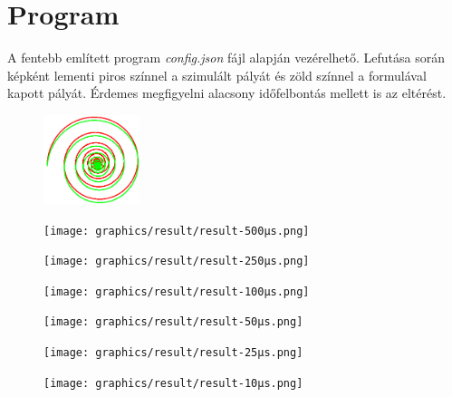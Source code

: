 \documentclass[a4paper]{article}
\begin{document}
\section{Program}
	A fentebb említett program \textit{config.json} fájl alapján vezérelhető. Lefutása során képként lementi piros színnel a szimulált pályát és zöld színnel a formulával kapott pályát. Érdemes megfigyelni alacsony időfelbontás mellett is az eltérést.
	\begin{figure}[h]
		\centering
		\begin{minipage}{0.25\textwidth}
			\centering
			\includegraphics[height=7em]{graphics/result/result-1ms.png}
		\end{minipage}%
		\begin{minipage}{0.25\textwidth}
			\centering
			\texttt{[image: graphics/result/result-500µs.png]}
		\end{minipage}%
		\begin{minipage}{0.25\textwidth}
			\centering
			\texttt{[image: graphics/result/result-250µs.png]}
		\end{minipage}%
		\begin{minipage}{0.25\textwidth}
			\centering
			\texttt{[image: graphics/result/result-100µs.png]}
		\end{minipage}
	\end{figure}
	\begin{figure}[h]
		\centering
		\begin{minipage}{0.25\textwidth}
			\centering
			\texttt{[image: graphics/result/result-50µs.png]}
		\end{minipage}%
		\begin{minipage}{0.25\textwidth}
			\centering
			\texttt{[image: graphics/result/result-25µs.png]}
		\end{minipage}%
		\begin{minipage}{0.25\textwidth}
			\centering
			\texttt{[image: graphics/result/result-10µs.png]}
		\end{minipage}
	\end{figure}\\
\end{document}
